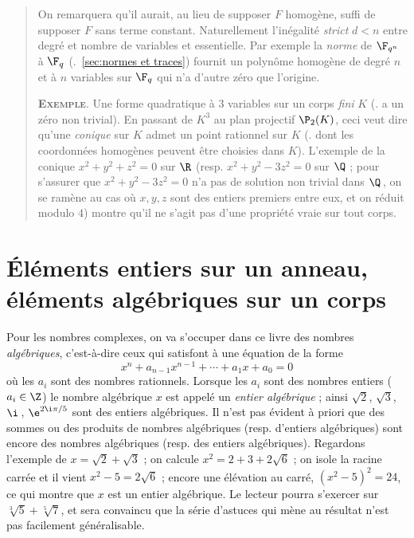 \documentclass[11pt, %
  title in boldface,
  theorem in new line,
  theorem numbering = section,
  number theorems separately,
  simple name,
]{beaulivre}
\begin{document}
    \begin{quote}
        On remarquera qu'il aurait, au lieu de supposer \( F \) homogène, suffi de supposer \( F \) sans terme constant. Naturellement l'inégalité \emph{strict} \( d < n \) entre degré et nombre de variables et essentielle. Par exemple la \emph{norme} de \( \F_{q^n} \) à \( \F_q \) (\cf.~\cref{sec:normes et traces}) fournit un polynôme homogène de degré \( n \) et à \( n \) variables sur \( \F_q \) qui n'a d'autre zéro que l'origine.

        \textsc{\textbf{Exemple}}.
        Une forme quadratique à \( 3 \) variables sur un corps \emph{fini} \( K \)  (\ie. a un zéro non trivial). En passant de \( K^3 \) au plan projectif \( \P_2(K) \), ceci veut dire qu'une \emph{conique} sur \( K \) admet un point rationnel sur \( K \) (\ie. dont les coordonnées homogènes peuvent être choisies dans \( K \)). L'exemple de la conique \( x^2+y^2+z^2 = 0 \) sur \( \R \) (resp. \( x^2+y^2-3z^2 = 0 \) sur \( \Q \) ; pour s'assurer que \( x^2+y^2-3z^2 = 0 \) n'a pas de solution non trivial dans \( \Q \)\,, on se ramène au cas où \( x,y,z \) sont des entiers premiers entre eux, et on réduit modulo \( 4 \)) montre qu'il ne s'agit pas d'une propriété vraie sur tout corps.
    \end{quote}


\chapter{Éléments entiers sur un anneau, éléments algébriques sur un corps}

Pour les nombres complexes, on va s'occuper dans ce livre des nombres \emph{algébriques}, c'est-à-dire ceux qui satisfont à une équation de la forme
\[
    x^n + a_{n-1} x^{n-1} + \cdots + a_1 x + a_0 = 0
\]
où les \( a_i \) sont des nombres rationnels. Lorsque les \( a_i \) sont des nombres entiers (\( a_i \in \Z \)) le nombre algébrique \( x \) est appelé un \emph{entier algébrique} ; ainsi \( \sqrt{2} \), \( \sqrt{3} \), \( \i \)\,, \( \e^{2\i\pi/5} \) sont des entiers algébriques. Il n'est pas évident à priori que des sommes ou des produits de nombres algébriques (resp. d'entiers algébriques) sont encore des nombres algébriques (resp. des entiers algébriques). Regardons l'exemple de \( x = \sqrt{2}+\sqrt{3} \) ; on calcule \( x^2 = 2+3+2\sqrt{6} \) ; on isole la racine carrée et il vient \( x^2-5 = 2\sqrt{6} \) ; encore une élévation au carré, \( (x^2-5)^2 = 24 \), ce qui montre que \( x \) est un entier algébrique. Le lecteur pourra s'exercer sur \( \sqrt[3]{5}+\sqrt[5]{7} \), et sera convaincu que la série d'astuces qui mène au résultat n'est pas facilement généralisable.
\end{document}
